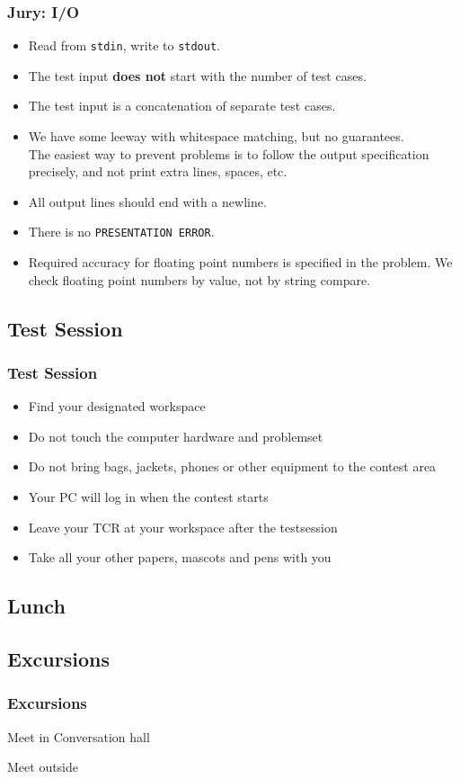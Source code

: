 \documentclass[t]{beamer}
\begin{document}
\begin{frame}[fragile]
    \frametitle{Jury: I/O}
	\begin{itemize}
		\item Read from \lstinline|stdin|, write to \lstinline|stdout|.
		\item The test input \textbf{does not} start with the number of test cases.
		\item The test input is a concatenation of separate test cases.
		\item We have some leeway with whitespace matching, but no guarantees. \\
		  The easiest way to prevent problems is to follow the output specification precisely, and not print extra lines, spaces, etc.
		\item All output lines should end with a newline.
		\item There is no \lstinline|PRESENTATION ERROR|.
		\item Required accuracy for floating point numbers is specified in the problem.
		      We check floating point numbers by value, not by string compare.
	 \end{itemize}
\end{frame}
\QuestionsFrame
\subsection{Test Session}
\begin{frame}
	\frametitle{Test Session}
	\begin{itemize}
		\item Find your designated workspace
		\item Do not touch the computer hardware and problemset
		\item Do not bring bags, jackets, phones or other equipment to the contest area
		\item Your PC will log in when the contest starts
		\item Leave your TCR at your workspace after the testsession
		\item Take all your other papers, mascots and pens with you
	\end{itemize}
\end{frame}
\subsection{Lunch}
\subsection{Excursions}
\begin{frame}
	\frametitle{Excursions}
	\begin{description}[l]
		\item[Beertasting] Meet in Conversation hall
		\item[Guided City Tour] Meet outside 
	\end{description}
\end{frame}
\end{document}
